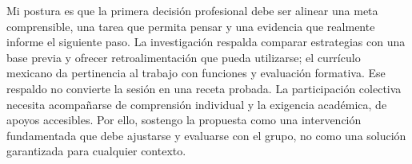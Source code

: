 \documentclass[spanish,letterpaper,oneside]{article}
\begin{document}
Mi postura es que la primera decisión profesional debe ser alinear una meta comprensible, una tarea que permita pensar y una evidencia que realmente informe el siguiente paso. La investigación respalda comparar estrategias con una base previa y ofrecer retroalimentación que pueda utilizarse; el currículo mexicano da pertinencia al trabajo con funciones y evaluación formativa. Ese respaldo no convierte la sesión en una receta probada. La participación colectiva necesita acompañarse de comprensión individual y la exigencia académica, de apoyos accesibles. Por ello, sostengo la propuesta como una intervención fundamentada que debe ajustarse y evaluarse con el grupo, no como una solución garantizada para cualquier contexto.

\clearpage
\begingroup
\small
{}

\endgroup
\end{document}
